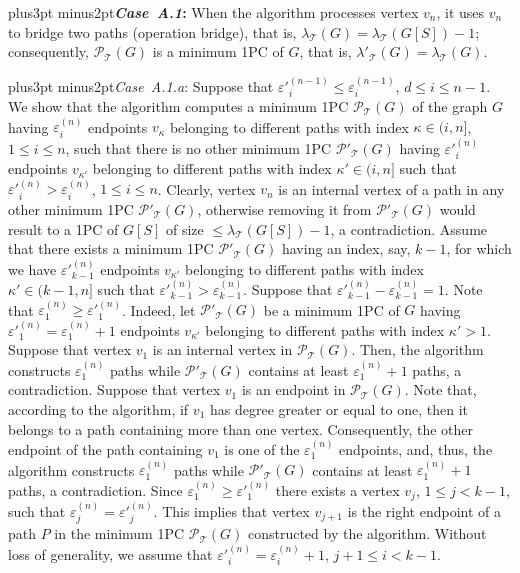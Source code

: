 \documentclass[10pt]{article}
\def\yskip{\penalty-50\vskip3pt plus3pt minus2pt}
\def\y{\yskip}
\begin{document}
{\y {\bf \textit{Case~A.1}:} When the algorithm processes vertex
$v_n$, it uses $v_n$ to bridge two paths (operation bridge), that
is, $\lambda_\mathcal{T}(G)=\lambda_\mathcal{T}(G[S])-1$;
consequently, $\mathcal{P_{\mathcal{T}}}(G)$ is a minimum 1PC of
$G$, that is, $\lambda'_\mathcal{T}(G)=\lambda_\mathcal{T}(G)$.

\y \textit{Case~A.1.a}: Suppose that $\varepsilon'^{(n-1)}_i \leq
\varepsilon^{(n-1)}_i$, $d \leq i \leq n-1$. We show that the
algorithm computes a minimum 1PC $\mathcal{P_{\mathcal{T}}}(G)$ of
the graph $G$ having $\varepsilon^{(n)}_i$ endpoints $v_\kappa$
belonging to different paths with index $\kappa \in (i,n]$, $1
\leq i \leq n$, such that there is no other minimum 1PC
$\mathcal{P'_{\mathcal{T}}}(G)$ having $\varepsilon'^{(n)}_i$
endpoints $v_{\kappa'}$ belonging to different paths with index
$\kappa' \in (i,n]$ such that
$\varepsilon'^{(n)}_i>\varepsilon^{(n)}_i$, $1 \leq i \leq n$.
Clearly, vertex $v_n$ is an internal vertex of a path in any other
minimum 1PC $\mathcal{P'_{\mathcal{T}}}(G)$, otherwise removing it
from $\mathcal{P'_{\mathcal{T}}}(G)$ would result to a 1PC of
$G[S]$ of size $\leq \lambda_\mathcal{T}(G[S])-1$, a
contradiction. Assume that there exists a minimum 1PC
$\mathcal{P'_{\mathcal{T}}}(G)$ having an index, say, $k-1$, for
which we have $\varepsilon'^{(n)}_{k-1}$ endpoints $v_{\kappa'}$
belonging to different paths with index $\kappa' \in (k-1,n]$ such
that $\varepsilon'^{(n)}_{k-1}>\varepsilon^{(n)}_{k-1}$. Suppose
that $\varepsilon'^{(n)}_{k-1} - \varepsilon^{(n)}_{k-1}= 1$. Note
that $\varepsilon^{(n)}_1 \geq \varepsilon'^{(n)}_1$. Indeed, let
$\mathcal{P'_{\mathcal{T}}}(G)$ be a minimum 1PC of $G$ having
$\varepsilon'^{(n)}_1 =\varepsilon^{(n)}_1 +1$ endpoints
$v_{\kappa'}$ belonging to different paths with index $\kappa'
>1$. Suppose that vertex $v_1$ is an internal vertex in
$\mathcal{P_{\mathcal{T}}}(G)$. Then, the algorithm constructs
$\varepsilon^{(n)}_1$ paths while $\mathcal{P'_{\mathcal{T}}}(G)$
contains at least $\varepsilon^{(n)}_1+1$ paths, a contradiction.
Suppose that vertex $v_1$ is an endpoint in
$\mathcal{P_{\mathcal{T}}}(G)$. Note that, according to the
algorithm, if $v_1$ has degree greater or equal to one, then it
belongs to a path containing more than one vertex. Consequently,
the other endpoint of the path containing $v_1$ is one of the
$\varepsilon^{(n)}_1$ endpoints, and, thus, the algorithm
constructs $\varepsilon^{(n)}_1$ paths while
$\mathcal{P'_{\mathcal{T}}}(G)$ contains at least
$\varepsilon^{(n)}_1+1$ paths, a contradiction. Since
$\varepsilon^{(n)}_1 \geq \varepsilon'^{(n)}_1$ there exists a
vertex $v_j$, $1 \leq j < k-1$, such that $\varepsilon^{(n)}_j =
\varepsilon'^{(n)}_j$. This implies that vertex $v_{j+1}$ is the
right endpoint of a path $P$ in the minimum 1PC
$\mathcal{P_{\mathcal{T}}}(G)$ constructed by the algorithm.
Without loss of generality, we assume that $\varepsilon'^{(n)}_i =
\varepsilon^{(n)}_i + 1$, $j+1 \leq i < k-1$.

}
\end{document}

